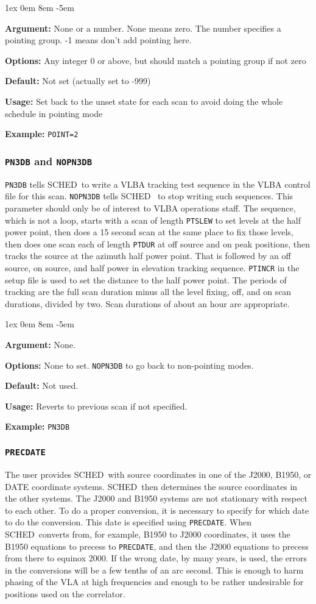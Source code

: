 \documentclass{report}
\newcommand{\schedb}{{\sc SCHED~}}
\newcommand{\rcwbox}[5]{
  \begin{list}{}{\parsep 1ex  \itemsep 0em
                 \leftmargin 8em  \itemindent -5em }
    \item {\bf Argument:} #1
    \item {\bf Options:}  #2
    \item {\bf Default:}  #3
    \item {\bf Usage:}    #4
    \item {\bf Example:}  #5
  \end{list}
}
\begin{document}
\rcwbox
{None or a number.  None means zero.  The number specifies a pointing group.  -1 means don't add pointing here.}
{Any integer 0 or above, but should match a pointing group if not zero}
{Not set (actually set to -999)}
{Set back to the unset state for each scan to avoid doing the
whole schedule in pointing mode}
{{\tt POINT=2}}


\subsubsection{\label{MP:PN3DB}{\tt PN3DB} and {\tt NOPN3DB}}

{\tt PN3DB} tells \schedb to write a VLBA tracking test sequence in
the VLBA control file for this scan. {\tt NOPN3DB} tells \schedb
to stop writing such sequences.  This parameter should only be of
interest to VLBA operations staff.  The sequence, which is not a
loop, starts with a scan of length {\tt PTSLEW} to set levels at
the half power point, then does a 15 second scan at the same place
to fix those levels, then does one scan each of length {\tt PTDUR}
at off source and on peak positions, then tracks the source at
the azimuth half power point.  That is followed by an off source,
on source, and half power in elevation tracking sequence.  {\tt PTINCR}
in the setup file is used to set the distance to the half power point.
The periods of tracking are the full scan duration minus all the
level fixing, off, and on scan durations, divided by two.  Scan
durations of about an hour are appropriate.


\rcwbox
{None.}
{None to set. {\tt NOPN3DB} to go back to non-pointing modes.}
{Not used.}
{Reverts to previous scan if not specified.}
{{\tt PN3DB}}


\subsubsection{\label{MP:PRECDATE}{\tt PRECDATE}}

The user provides \schedb with source coordinates in one of the J2000,
B1950, or DATE coordinate systems.  \schedb then determines the source
coordinates in the other systems.  The J2000 and B1950 systems are not
stationary with respect to each other.  To do a proper conversion, it
is necessary to specify for which date to do the conversion.  This
date is specified using {\tt PRECDATE}.  When \schedb converts from,
for example, B1950 to J2000 coordinates, it uses the B1950 equations
to precess to {\tt PRECDATE}, and then the J2000 equations to precess
from there to equinox 2000.  If the wrong date, by many years, is used,
the errors in the conversions will be a few tenths of an arc second.
This is enough to harm phasing of the VLA at high frequencies and
enough to be rather undesirable for positions used on the correlator.
\end{document}
